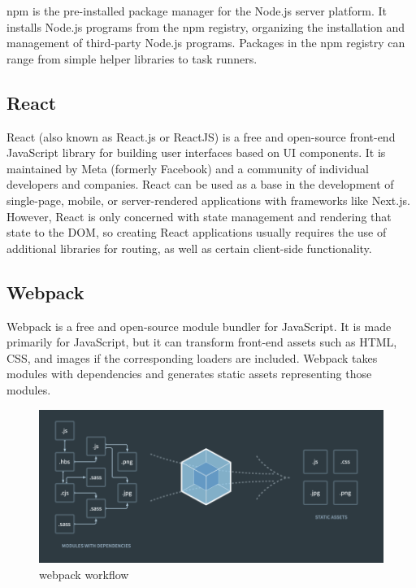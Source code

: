 npm is the pre-installed package manager for the Node.js server platform. It installs Node.js programs from the npm registry, organizing the installation and management of third-party Node.js programs. Packages in the npm registry can range from simple helper libraries to task runners.

\subsection {React}

React (also known as React.js or ReactJS) is a free and open-source front-end JavaScript library for building user interfaces based on UI components. It is maintained by Meta (formerly Facebook) and a community of individual developers and companies. React can be used as a base in the development of single-page, mobile, or server-rendered applications with frameworks like Next.js. However, React is only concerned with state management and rendering that state to the DOM, so creating React applications usually requires the use of additional libraries for routing, as well as certain client-side functionality.

\subsection {Webpack}

Webpack is a free and open-source module bundler for JavaScript. It is made primarily for JavaScript, but it can transform front-end assets such as HTML, CSS, and images if the corresponding loaders are included. Webpack takes modules with dependencies and generates static assets representing those modules.

\begin{figure}[h!]
    \vspace{0.5cm}
    \includegraphics[width=\textwidth]{images/webpack-bundle.png}
    \caption{webpack workflow}
    \label{fig:webpack-bundle} %
\end{figure}

